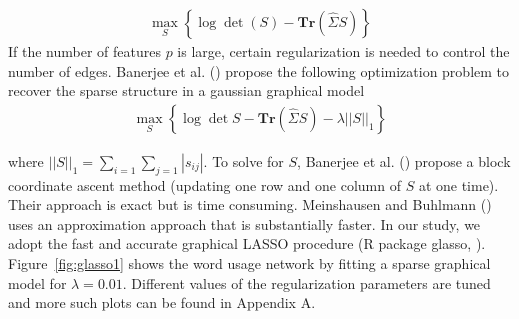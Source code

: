 \documentclass[11pt]{article}
\newcommand{\note}[1]{{\em \color{red} #1}}
\newcommand{\1}[1]{{\mathbf 1}\left\{#1\right\}}        %
\def\lp{\left(}
\def\rp{\right)}
\begin{document}
\begin{align}
\label{eq:mle}
\max_S \left\{  \log \det \lp S\rp - \textbf{Tr}( \hat{\Sigma}S)  \right\}
\end{align}
If the number of features $p$ is large, certain regularization is needed to control the number of edges. Banerjee et al. (\cite{banerjee2008model}) propose the following optimization problem to recover the sparse structure in a gaussian graphical model
\begin{align}
\label{eq:gLasso}
\max_S \left\{ \log \det S - \textbf{Tr} \lp \hat{\Sigma}S \rp - \lambda ||S||_1 \right\}
\end{align}

where $||S||_1 = \sum_{i=1}\sum_{j=1} |s_{ij}|$. To solve for $S$,  Banerjee et al. (\cite{banerjee2008model}) propose a block coordinate ascent method (updating one row and one column of $S$ at one time). Their approach is exact but is time consuming. Meinshausen and Buhlmann (\cite{meinshausen2006high}) uses an approximation approach that is substantially faster. In our study, we adopt the fast and accurate graphical LASSO procedure ({\sffamily R} package {\sffamily glasso}, \cite{Rglasso}). Figure~\ref{fig:glasso1} shows the word usage network by fitting a sparse graphical model for $\lambda=0.01$. Different values of the regularization parameters are tuned and more such plots can be found in Appendix A. 


\end{document}
